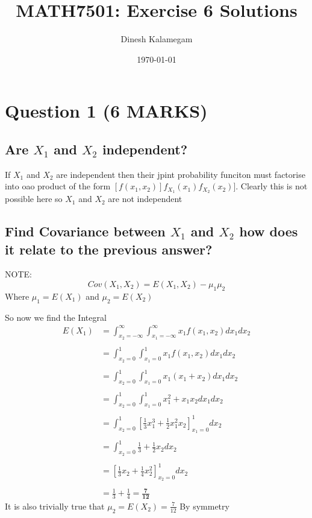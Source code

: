 \documentclass[11pt]{article}
\begin{document}
\title{MATH7501: Exercise 6 Solutions}
\author{Dinesh Kalamegam}
\date{\today}
\maketitle

\renewcommand\qedsymbol{\textbf{\emph{Quod Erat Demonstrandum}}}
\setlength{\parindent}{0pt}
\setlength{\parskip}{\baselineskip}
\newtheorem{theorem}{Theorem}[section]
\newtheorem{definition}[theorem]{Defintion}
\newtheorem{proposition}[theorem]{Proposition}
\newtheorem{corollary}[theorem]{Corollary}

\section{Question 1 (6 MARKS)}
\subsection{Are $X_{1}$ and $X_{2}$ independent?}
If $X_{1}$ and $X_{2}$ are independent then their jpint probability funciton must factorise into oao product of the form $[f(x_{1},x_{2})]f_{X_{1}}(x_{1}) f_{X_{2}}{(x_{2})}]$. Clearly this is not possible here so $X_{1}$ and $X_{2}$ are not independent
\subsection{Find Covariance between $X_{1}$ and $X_{2}$ how does it relate to the previous answer?}
NOTE:
\begin{equation*}
  Cov(X_{1},X_{2}) = E(X_{1},X_{2}) -\mu_{1}\mu_{2}
\end{equation*}
Where $\mu_{1}=E(X_{1})$ and $\mu_{2}=E(X_{2})$

So now we find the Integral
\begin{align*}
  E(X_{1}) &= \int_{x_{2}=-\infty}^{\infty} \int_{x_{1}=-\infty}^{\infty} x_{1}f(x_{1},x_{2})dx_{1}dx_{2} \\ \\
  &= \int_{x_{2}=0}^{1} \int_{x_{1}=0}^{1} x_{1}f(x_{1},x_{2})dx_{1}dx_{2} \\ \\
  &= \int_{x_{2}=0}^{1} \int_{x_{1}=0}^{1} x_{1}(x_{1}+x_{2})dx_{1}dx_{2} \\ \\
  &= \int_{x_{2}=0}^{1} \int_{x_{1}=0}^{1} x_{1}^{2}+ x_{1}x_{2}dx_{1}dx_{2} \\ \\
  &= \int_{x_{2}=0}^{1} \left[\frac{1}{3}x_{1}^{3} +\frac{1}{2}x_{1}^{2}x_{2} \right]_{x_{1}=0}^{1} dx_{2} \\ \\
  &= \int_{x_{2}=0}^{1} \frac{1}{3}+\frac{1}{2}x_{2} dx_{2} \\ \\
  &= \left[\frac{1}{3}x_{2}+\frac{1}{4}x_{2}^{2} \right]_{x_{2}=0}^{1} dx_{2} \\ \\
  &= \frac{1}{3} + \frac{1}{4} = \bm{\frac{7}{12}}
\end{align*}
It is also trivially true that $\mu_{2} = E(X_{2}) = \frac{7}{12}$ By symmetry
\end{document}
